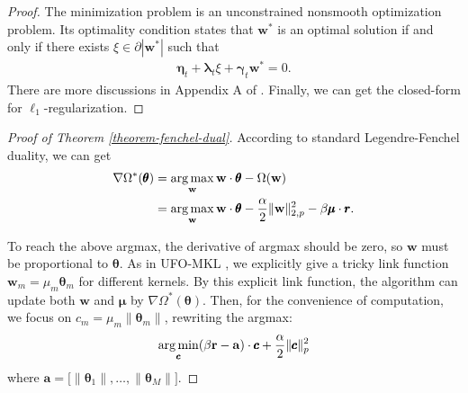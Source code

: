 \documentclass{article}
\newcommand{\argmax}{\operatornamewithlimits{arg\,max}}
\newcommand{\argmin}{\operatornamewithlimits{arg\,min}}
\begin{document}
\begin{proof}
The minimization problem is an unconstrained nonsmooth optimization problem. Its optimality condition \cite{rockafellar2015convex} states that $\mathbf{w}^\ast$ is an optimal solution if and only if there exists $\xi \in \partial|\mathbf{w}^\ast|$ such that
\begin{align*}
    \mathbf{\eta}_t+\mathbf{\lambda}_t\xi+\mathbf{\gamma}_t\mathbf{w}^\ast=0.
\end{align*}
There are more discussions in Appendix A of \cite{Xiao10}. Finally, we can get the closed-form for $\ell_1$-regularization.
\end{proof}


\begin{proof}[Proof of Theorem \ref{theorem-fenchel-dual}]
According to standard Legendre-Fenchel duality, we can get
\begin{align*}
\nabla\Omega^*(\pmb{\theta})&=\argmax\limits_{\mathbf w} \mathbf w \cdot \pmb{\theta} - \Omega(\mathbf w)\\
&=\argmax\limits_{\mathbf w} \mathbf w \cdot \pmb{\theta}
-\frac{\alpha}{2}\|\mathbf w\|_{2,p}^2
-\beta\pmb{\mu}\cdot\pmb{r}.
\end{align*}

To reach the above argmax, the derivative of argmax should be zero,
so $\mathbf w$ must be proportional to $\pmb{\theta}$.
As in UFO-MKL \cite{OrabonaL11}, we explicitly give a tricky link function
$\mathbf w_m=\mu_m\pmb{\theta}_m$ for different kernels.
By this explicit link function, the algorithm can update both $\mathbf w$ and $\pmb \mu$ by $\nabla\Omega^\ast(\pmb{\theta})$.
Then, for the convenience of computation, we focus on $c_m=\mu_m\|\pmb{\theta}_m\|$, rewriting the argmax:
\begin{align}
    \label{lp-regularization}
    \argmin \limits_{\pmb{c}} (\beta\mathbf{r} - \mathbf{a})\cdot\pmb{c}+\frac{\alpha}{2}\|\pmb{c}\|_p^2
\end{align}
where $\mathbf{a}=\Big[\|\pmb{\theta}_1\|,\ldots, \|\pmb{\theta}_M\|\Big]$.


\end{proof}
\end{document}
